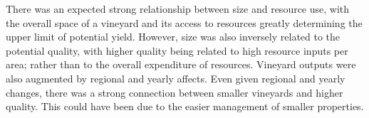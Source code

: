 \documentclass[review,12pt,authoryear]{elsarticle}
\begin{document}
\begin{linenumbers}
%
%
%
%


There was an expected strong relationship between size and resource use, with the overall space of a vineyard and its access to resources greatly determining the upper limit of potential yield. However, size was also inversely related to the potential quality, with higher quality being related to high resource inputs per area; rather than to the overall expenditure of resources. Vineyard outputs were also augmented by regional and yearly affects. Even given regional and yearly changes, there was a strong connection between smaller vineyards and higher quality. This could have been due to the easier management of smaller properties.

\end{linenumbers}
\end{document}
